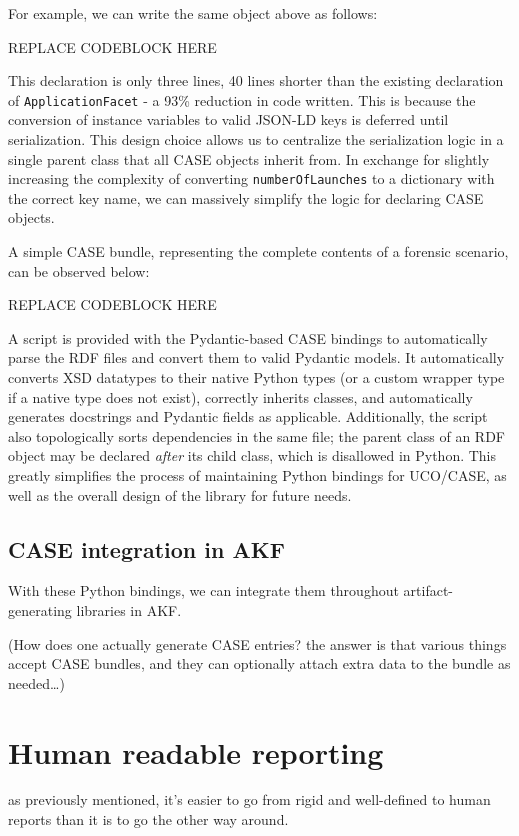 For example, we can write the same object above as follows:

REPLACE CODEBLOCK HERE

This declaration is only three lines, 40 lines shorter than the existing
declaration of \texttt{ApplicationFacet} - a 93\% reduction in code
written. This is because the conversion of instance variables to valid
JSON-LD keys is deferred until serialization. This design choice allows
us to centralize the serialization logic in a single parent class that
all CASE objects inherit from. In exchange for slightly increasing the
complexity of converting \texttt{numberOfLaunches} to a dictionary with
the correct key name, we can massively simplify the logic for declaring
CASE objects.

A simple CASE bundle, representing the complete contents of a forensic
scenario, can be observed below:

REPLACE CODEBLOCK HERE

A script is provided with the Pydantic-based CASE bindings to
automatically parse the RDF files and convert them to valid Pydantic
models. It automatically converts XSD datatypes to their native Python
types (or a custom wrapper type if a native type does not exist),
correctly inherits classes, and automatically generates docstrings and
Pydantic fields as applicable. Additionally, the script also
topologically sorts dependencies in the same file; the parent class of
an RDF object may be declared \emph{after} its child class, which is
disallowed in Python. This greatly simplifies the process of maintaining
Python bindings for UCO/CASE, as well as the overall design of the
library for future needs.

\subsection{CASE integration in
AKF}\label{case-integration-in-akf}

With these Python bindings, we can integrate them throughout
artifact-generating libraries in AKF.

(How does one actually generate CASE entries? the answer is that various
things accept CASE bundles, and they can optionally attach extra data to
the bundle as needed\ldots)

\section{Human readable reporting}\label{human-readable-reporting}

as previously mentioned, it's easier to go from rigid and well-defined
to human reports than it is to go the other way around.

